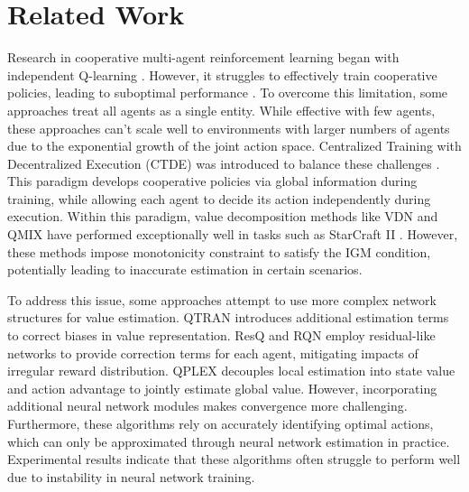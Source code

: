 \section{Related Work}
Research in cooperative multi-agent reinforcement learning began with independent Q-learning \cite{littman1994markov}. However, it struggles to effectively train cooperative policies, leading to suboptimal performance \cite{claus1998dynamics}. To overcome this limitation, some approaches \cite{foerster2017stabilising,foerster2018counterfactual} treat all agents as a single entity. While effective with few agents, these approaches can't scale well to environments with larger numbers of agents due to the exponential growth of the joint action space. Centralized Training with Decentralized Execution (CTDE) was introduced to balance these challenges \cite{lowe2017multi}. This paradigm develops cooperative policies via global information during training, while allowing each agent to decide its action independently during execution. Within this paradigm, value decomposition methods like VDN \cite{sunehag2017value} and QMIX \cite{rashid2020monotonic} have performed exceptionally well in tasks such as StarCraft II \cite{samvelyan2019starcraft}. However, these methods impose monotonicity constraint to satisfy the IGM condition, potentially leading to inaccurate estimation in certain scenarios.

To address this issue, some approaches attempt to use more complex network structures for value estimation. QTRAN \cite{son2019qtran} introduces additional estimation terms to correct biases in value representation. ResQ \cite{shen2022resq} and RQN \cite{pina2022residual} employ residual-like networks to provide correction terms for each agent, mitigating impacts of irregular reward distribution. QPLEX \cite{wang2020qplex} decouples local estimation into state value and action advantage to jointly estimate global value. However, incorporating additional neural network modules makes convergence more challenging. Furthermore, these algorithms rely on accurately identifying optimal actions, which can only be approximated through neural network estimation in practice. Experimental results \cite{papoudakis2020benchmarking} indicate that these algorithms often struggle to perform well due to instability in neural network training.

